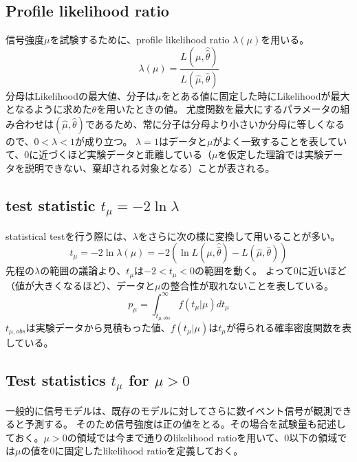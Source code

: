 \subsection{Profile likelihood ratio}
信号強度$\mu$を試験するために、profile likelihood ratio $\lambda(\mu)$を用いる。
\begin{equation}
  \lambda(\mu) = \frac{L(\mu,\hat{\hat{\theta}})}{L(\hat{\mu},\hat{\theta})}
\end{equation}
分母はLikelihoodの最大値、分子は$\mu$をとある値に固定した時にLikelihoodが最大となるように求めた$\theta$を用いたときの値。
尤度関数を最大にするパラメータの組み合わせは$(\hat{\mu},\hat{\theta})$であるため、常に分子は分母より小さいか分母に等しくなるので、$0<\lambda<1$が成り立つ。
$\lambda=1$はデータと$\mu$がよく一致することを表していて、0に近づくほど実験データと乖離している（$\mu$を仮定した理論では実験データを説明できない、棄却される対象となる）ことが表される。

\subsection{test statistic $t_\mu=-2\ln\lambda$}
statistical testを行う際には、$\lambda$をさらに次の様に変換して用いることが多い。
\begin{equation}
  t_\mu=-2\ln\lambda(\mu) = -2 \left(\ln L(\mu,\hat{\hat{\theta}}) -  L(\hat{\mu},\hat{\theta} ) \right)
\end{equation}
先程の$\lambda$の範囲の議論より、$t_\mu$は$-2<t_\mu<0$の範囲を動く。
よって0に近いほど（値が大きくなるほど）、データと$\mu$の整合性が取れないことを表している。
\begin{equation}
p_\mu = \int_{t_{\mu,obs}} ^{\infty} f(t_\mu|\mu) dt_\mu
\end{equation}
$t_{\mu,obs}$は実験データから見積もった値、$f(t_\mu|\mu)$は$t_\mu$が得られる確率密度関数を表している。

\subsection{Test statistics $t_\mu$ for $\mu > 0$}
一般的に信号モデルは、既存のモデルに対してさらに数イベント信号が観測できると予測する。
そのため信号強度は正の値をとる。その場合を試験量も記述しておく。$\mu>0$の領域では今まで通りのlikelihood ratioを用いて、0以下の領域では$\mu$の値を0に固定したlikelihood ratioを定義しておく。

